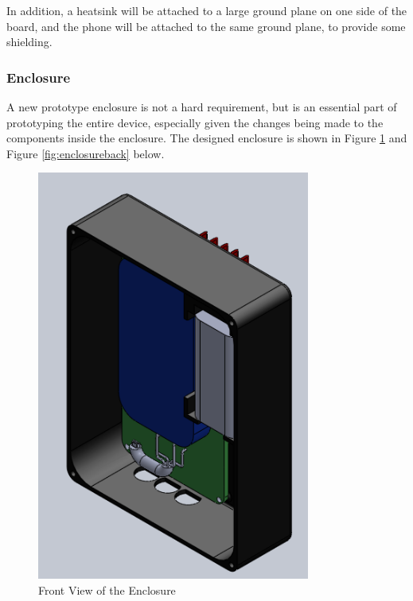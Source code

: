\documentclass{article}
\numberwithin{figure}{section}
\numberwithin{equation}{section}
\begin{document}
{In addition, a heatsink will be attached to a large ground plane on one side of the board, and the phone will be attached to the same ground plane, to provide some shielding.

\subsubsection{Enclosure}

A new prototype enclosure is not a hard requirement, but is an essential part of prototyping the entire device, especially given the changes being made to the components inside the enclosure. The designed enclosure is shown in Figure \ref{fig:enclosurefront} and Figure \ref{fig:enclosureback} below.

\begin{figure}[H]
	\centering
	\includegraphics[width=0.8\textwidth]{Assembly2}
	\caption{Front View of the Enclosure}
	\label{fig:enclosurefront}
\end{figure}

}
\end{document}
